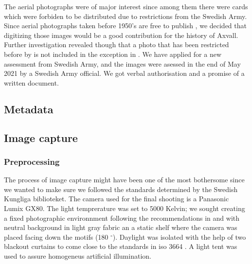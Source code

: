 \documentclass[12 pt]{paper}
\begin{document}
The aerial photographs were of major interest since among them there were cards  which were forbiden to be distributed due to restrictions from the Swedish Army. Since aerial photographs taken before 1950's are free to publish \autocite[][kap. 3, 3§]{lantm2018}, we decided that digitizing those images would be a good contribution for the history of Axvall. Further investigation revealed though that a photo that has been restricted before by is not included in the exception in \textcite{lantm2018}. We have applied for a new assessment from Swedish Army, and the images were asessed in the end of May 2021 by a Swedish Army official. We got verbal authorisation and a promise of a written document.
\subsection{Metadata}

\subsection{Image capture}
\subsubsection{Preprocessing}
The process of image capture might have been one of the most bothersome since we wanted to make sure we followed the standards determined by the Swedish Kungliga biblioteket. The camera used for the final shooting is a Panasonic Lumix GX80. The light temprerature was set to 5000 Kelvin; we sought creating a fixed photographic environnment following the recommendations in \textcite[]{dgf1216} and \textcite[part 3]{kronlund2021p3} with neutral background in light gray fabric an a static shelf where the camera was placed facing down the motifs (180 $ ^{\circ} $). Daylight was isolated with the help of two blackout curtains to come close to the standards in iso 3664 \autocite[cf.][]{johansson2021}. A light tent was used to assure homogeneus artificial illumination.  %
\end{document}
